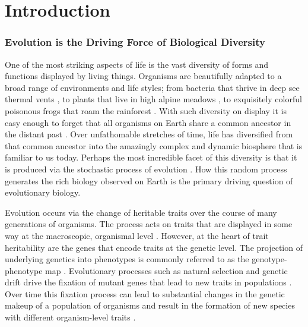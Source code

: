 \chapter{Introduction}

\subsection{Evolution is the Driving Force of Biological Diversity}

One of the most striking aspects of life is the vast diversity of
forms and functions displayed by living things. Organisms are beautifully
adapted to a broad range of environments and life styles; from bacteria
that thrive in deep see thermal vents \citep{zierenberg_life_2000},
to plants that live in high alpine meadows \citep{bliss_adaptations_1962},
to exquisitely colorful poisonous frogs that roam the rainforest \citep{summers_evolution_2001}.
With such diversity on display it is easy enough to forget that all
organisms on Earth share a common ancestor in the distant past \citep{darwin_origin_1859,weiss_physiology_2016,glansdorff_last_2008,lane_how_2010}.
Over unfathomable stretches of time, life has diversified from that
common ancestor into the amazingly complex and dynamic biosphere that
is familiar to us today. Perhaps the most incredible facet of this
diversity is that it is produced via the stochastic process of evolution
\citep{darwin_origin_1859,lewontin_genetic_1974,jacob_evolution_1977,woese_towards_1990,nei_molecular_1998}.
How this random process generates the rich biology observed on Earth
is the primary driving question of evolutionary biology. 

Evolution occurs via the change of heritable traits over the course
of many generations of organisms. The process acts on traits that
are displayed in some way at the macroscopic, organismal level \citep{lewontin_genetic_1974,gillespie_population_1998,gillespie_molecular_1984,fisher_genetical_nodate,wright_evolution_1931}.
However, at the heart of trait heritability are the genes that encode
traits at the genetic level. The projection of underlying genetics
into phenotypes is commonly referred to as the genotype-phenotype
map \citep{fontana_shaping_1998,stadler_genotype-phenotype_2006}.
Evolutionary processes such as natural selection and genetic drift
drive the fixation of mutant genes that lead to new traits in populations
\citep{gillespie_simple_1983,gillespie_molecular_1984,gillespie_population_1998,orr_population_2002}.
Over time this fixation process can lead to substantial changes in
the genetic makeup of a population of organisms and result in the
formation of new species with different organism-level traits \citep{mcniven_genetic_2011,abbott_hybridization_2013,hedges_tree_2015,egan_experimental_2015,fisher_genetical_nodate}. 

